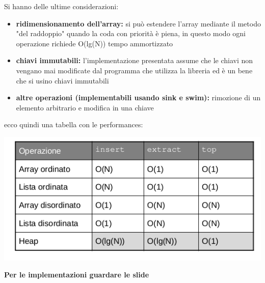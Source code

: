 \documentclass[a4paper,12pt, oneside]{book}
\begin{document}
Si hanno delle ultime considerazioni:
\begin{itemize}
\item \textbf{ridimensionamento dell'array: }si può estendere l'array mediante il metodo "del raddoppio" quando
la coda con priorità è piena, in questo modo ogni operazione richiede O(lg(N)) tempo
ammortizzato
\item \textbf{chiavi immutabili:} l'implementazione presentata assume che le chiavi non vengano
mai modificate dal programma che utilizza la libreria ed è un bene che si usino chiavi immutabili
\item \textbf{altre operazioni (implementabili usando sink e swim):} rimozione di un elemento arbitrario e modifica in una chiave
\end{itemize}
\newpage
ecco quindi una tabella con le performances:
\begin{center}
\includegraphics[scale=2.5]{img/c14.png}
\end{center}
\textbf{Per le implementazioni guardare le slide}
\end{document}
